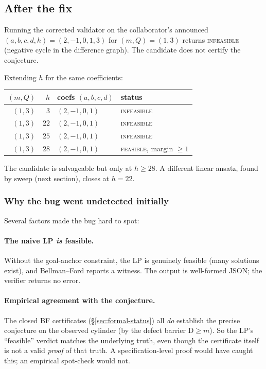\documentclass[11pt,a4paper]{article}
\theoremstyle{plain}
\theoremstyle{definition}
\newcommand{\defect}{\mathrm{D}}
\begin{document}
\subsection{After the fix}

Running the corrected validator on the collaborator's announced
$(a, b, c, d, h) = (2, -1, 0, 1, 3)$ for $(m, Q) = (1, 3)$ returns
\textsc{infeasible} (negative cycle in the difference graph).
The candidate does not certify the conjecture.

Extending $h$ for the same coefficients:

\begin{center}\small
\begin{tabular}{rrll}
\toprule
$(m, Q)$ & $h$ & coefs $(a, b, c, d)$ & status \\
\midrule
$(1, 3)$ & $3$ & $(2, -1, 0, 1)$ & \textsc{infeasible} \\
$(1, 3)$ & $22$ & $(2, -1, 0, 1)$ & \textsc{infeasible} \\
$(1, 3)$ & $25$ & $(2, -1, 0, 1)$ & \textsc{infeasible} \\
$(1, 3)$ & $28$ & $(2, -1, 0, 1)$ & \textsc{feasible}, margin $\ge 1$ \\
\bottomrule
\end{tabular}
\end{center}

The candidate is salvageable but only at $h \ge 28$. A different
linear ansatz, found by sweep (next section), closes at $h = 22$.

\subsubsection*{Why the bug went undetected initially}

Several factors made the bug hard to spot:

\paragraph{The naive LP \emph{is} feasible.}
Without the goal-anchor constraint, the LP is genuinely feasible
(many solutions exist), and Bellman--Ford reports a witness. The
output is well-formed JSON; the verifier returns no error.

\paragraph{Empirical agreement with the conjecture.}
The closed BF certificates (\S\ref{sec:formal-status}) all
\emph{do} establish the precise conjecture on the observed
cylinder (by the defect barrier $\defect \ge m$). So the LP's
``feasible'' verdict matches the underlying truth, even though
the certificate itself is not a valid \emph{proof} of that truth.
A specification-level proof would have caught this; an empirical
spot-check would not.
\end{document}
